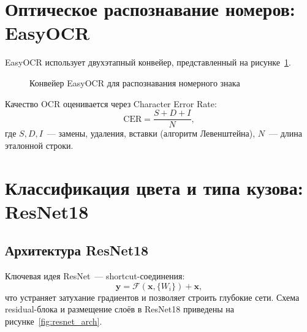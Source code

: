 \documentclass[10pt,a4paper]{report}
\numberwithin{equation}{chapter}
\numberwithin{figure}{chapter}
\numberwithin{table}{chapter}
\begin{document}
\section{Оптическое распознавание номеров: EasyOCR}

EasyOCR использует двухэтапный конвейер, представленный
на рисунке~\ref{fig:ocr_pipeline}.

\begin{figure}[H]
\centering
{}
\caption{Конвейер EasyOCR для распознавания номерного знака}
\label{fig:ocr_pipeline}
\end{figure}

Качество OCR оценивается через Character Error Rate:
\begin{equation}
  \mathrm{CER} = \frac{S + D + I}{N},
\end{equation}
где $S, D, I$~--- замены, удаления, вставки (алгоритм Левенштейна),
$N$~--- длина эталонной строки.

\section{Классификация цвета и типа кузова: ResNet18}

\subsection{Архитектура ResNet18}

Ключевая идея ResNet~--- shortcut-соединения:
\begin{equation}
  \mathbf{y} = \mathcal{F}(\mathbf{x},\{W_i\}) + \mathbf{x},
\end{equation}
что устраняет затухание градиентов и позволяет строить глубокие сети.
Схема residual-блока и размещение слоёв в ResNet18 приведены
на рисунке~\ref{fig:resnet_arch}.
\end{document}
